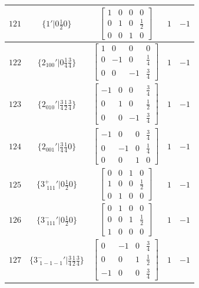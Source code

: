 \documentclass[fleqn,8pt]{jsarticle}
\begin{document}
\begin{longtable}{ccccc}
$ 121 $ & $ \{1{}'|0 \frac{1}{2} 0\} $ & $ \begin{bmatrix} 1 & 0 & 0 & 0 \\ 0 & 1 & 0 & \frac{1}{2} \\ 0 & 0 & 1 & 0 \end{bmatrix} $ & $ 1 $ & $ -1 $ \\ \hline
$ 122 $ & $ \{2{}_{100}{}'|0 \frac{1}{4} \frac{3}{4}\} $ & $ \begin{bmatrix} 1 & 0 & 0 & 0 \\ 0 & -1 & 0 & \frac{1}{4} \\ 0 & 0 & -1 & \frac{3}{4} \end{bmatrix} $ & $ 1 $ & $ -1 $ \\ \hline
$ 123 $ & $ \{2{}_{010}{}'|\frac{3}{4} \frac{1}{2} \frac{3}{4}\} $ & $ \begin{bmatrix} -1 & 0 & 0 & \frac{3}{4} \\ 0 & 1 & 0 & \frac{1}{2} \\ 0 & 0 & -1 & \frac{3}{4} \end{bmatrix} $ & $ 1 $ & $ -1 $ \\ \hline
$ 124 $ & $ \{2{}_{001}{}'|\frac{3}{4} \frac{1}{4} 0\} $ & $ \begin{bmatrix} -1 & 0 & 0 & \frac{3}{4} \\ 0 & -1 & 0 & \frac{1}{4} \\ 0 & 0 & 1 & 0 \end{bmatrix} $ & $ 1 $ & $ -1 $ \\ \hline
$ 125 $ & $ \{3^{+}_{\,\,111}{}'|0 \frac{1}{2} 0\} $ & $ \begin{bmatrix} 0 & 0 & 1 & 0 \\ 1 & 0 & 0 & \frac{1}{2} \\ 0 & 1 & 0 & 0 \end{bmatrix} $ & $ 1 $ & $ -1 $ \\ \hline
$ 126 $ & $ \{3^{-}_{\,\,111}{}'|0 \frac{1}{2} 0\} $ & $ \begin{bmatrix} 0 & 1 & 0 & 0 \\ 0 & 0 & 1 & \frac{1}{2} \\ 1 & 0 & 0 & 0 \end{bmatrix} $ & $ 1 $ & $ -1 $ \\ \hline
$ 127 $ & $ \{3^{-}_{\,\,1-1-1}{}'|\frac{3}{4} \frac{1}{2} \frac{3}{4}\} $ & $ \begin{bmatrix} 0 & -1 & 0 & \frac{3}{4} \\ 0 & 0 & 1 & \frac{1}{2} \\ -1 & 0 & 0 & \frac{3}{4} \end{bmatrix} $ & $ 1 $ & $ -1 $ \\ \hline

\end{longtable}
\end{document}
